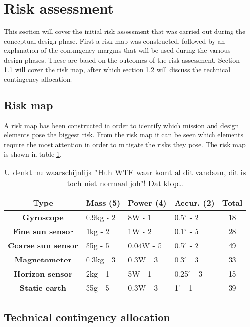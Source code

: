 \section{Risk assessment} 
\label{ch:risk}
This section will cover the initial risk assessment that was carried out during the conceptual design phase. First a risk map was constructed, followed by an explanation of the contingency margins that will be used during the various design phases. These are based on the outcomes of the risk assessment. Section \ref{sec:riskmap} will cover the risk map, after which section \ref{sec:tca} will discuss the technical contingency allocation.

\subsection{Risk map}
\label{sec:riskmap}
 A risk map has been constructed in order to identify which mission and design elements pose the biggest risk. From the risk map it can be seen which elements require the most attention in order to mitigate the risks they pose. The risk map is shown in table \ref{tab:riskmap}.

\begin{table}[h!]
\centering
\caption{U denkt nu waarschijnlijk "Huh WTF waar komt al dit vandaan, dit is toch niet normaal joh"! Dat klopt.}
\label{tab:riskmap}
    \begin{tabular}{|c || >{\centering}m{40mm} | >{\centering}m{32mm} | >{\centering}m{16mm} | c |}
    \hline
    \bf{Type} & \bf{Mass} (5) & \bf{Power} (4) & \bf{Accur.} (2) & \bf{Total} \\ \hline \hline
    \bf{Gyroscope} & \cellcolor{yellow!25}0.9kg - 2 & \cellcolor{red!25}8W - 1 & \cellcolor{yellow!25}0.5$^\circ$ - 2 & \cellcolor{red!25}18 \\ \hline
    \bf{Fine sun sensor} & \cellcolor{yellow!25}1kg - 2 & \cellcolor{yellow!25}1W - 2 & \cellcolor{green!25}0.1$^\circ$ - 5 & \cellcolor{yellow!25}28\\ \hline
    \bf{Coarse sun sensor} & \cellcolor{green!25} 35g - 5 & \cellcolor{green!25}0.04W - 5 & \cellcolor{yellow!25}0.5$^\circ$ - 2 & \cellcolor{yellow!25}49\\ \hline
    \bf{Magnetometer} & \cellcolor{blue!25} 0.3kg - 3 & \cellcolor{blue!25}0.3W - 3  & \cellcolor{blue!25}0.3$^\circ$ - 3 & \cellcolor{blue!25}33\\ \hline
     \bf{Horizon sensor} & \cellcolor{red!25}2kg - 1 & \cellcolor{red!25}5W - 1 & \cellcolor{blue!25}0.25$^\circ$ - 3 & \cellcolor{red!25}15\\ \hline 
     \bf{Static earth} & \cellcolor{green!25}35g - 5 & \cellcolor{blue!25}0.3W - 3 & \cellcolor{red!25}1$^\circ$ - 1 & \cellcolor{red!25}39\\ \hline
    \end{tabular}
\end{table}

\subsection{Technical contingency allocation}
\label{sec:tca}
